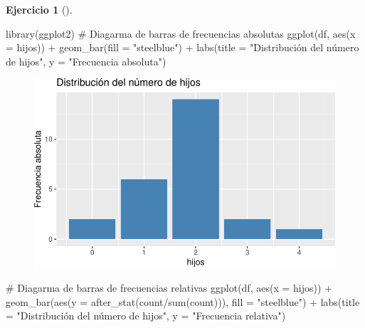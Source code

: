 \documentclass[
  a4paper,
]{scrreport}
\newenvironment{Shaded}{\begin{snugshade}}{\end{snugshade}}
\newcommand{\AttributeTok}[1]{\textcolor[rgb]{0.40,0.45,0.13}{#1}}
\newcommand{\CommentTok}[1]{\textcolor[rgb]{0.37,0.37,0.37}{#1}}
\newcommand{\FunctionTok}[1]{\textcolor[rgb]{0.28,0.35,0.67}{#1}}
\newcommand{\NormalTok}[1]{\textcolor[rgb]{0.00,0.23,0.31}{#1}}
\newcommand{\SpecialCharTok}[1]{\textcolor[rgb]{0.37,0.37,0.37}{#1}}
\newcommand{\StringTok}[1]{\textcolor[rgb]{0.13,0.47,0.30}{#1}}
\theoremstyle{definition}
\newtheorem{exercise}{Ejercicio}[chapter]
\theoremstyle{remark}
\begin{document}
\begin{exercise}[]
\begin{enumerate}
\begin{tcolorbox}
\begin{Shaded}
\begin{Highlighting}[]
\FunctionTok{library}\NormalTok{(ggplot2)}
\CommentTok{\# Diagarma de barras de frecuencias absolutas}
\FunctionTok{ggplot}\NormalTok{(df, }\FunctionTok{aes}\NormalTok{(}\AttributeTok{x =}\NormalTok{ hijos)) }\SpecialCharTok{+}
    \FunctionTok{geom\_bar}\NormalTok{(}\AttributeTok{fill =} \StringTok{"steelblue"}\NormalTok{) }\SpecialCharTok{+} 
    \FunctionTok{labs}\NormalTok{(}\AttributeTok{title =} \StringTok{"Distribución del número de hijos"}\NormalTok{, }\AttributeTok{y =} \StringTok{"Frecuencia absoluta"}\NormalTok{)}
\end{Highlighting}
\end{Shaded}

  \begin{figure}[H]

  {\centering \includegraphics{03-frecuencias-graficos_files/figure-pdf/unnamed-chunk-7-1.pdf}

  }

  \end{figure}

\begin{Shaded}
\begin{Highlighting}[]
\CommentTok{\# Diagarma de barras de frecuencias relativas}
\FunctionTok{ggplot}\NormalTok{(df, }\FunctionTok{aes}\NormalTok{(}\AttributeTok{x =}\NormalTok{ hijos)) }\SpecialCharTok{+}
    \FunctionTok{geom\_bar}\NormalTok{(}\FunctionTok{aes}\NormalTok{(}\AttributeTok{y =} \FunctionTok{after\_stat}\NormalTok{(count}\SpecialCharTok{/}\FunctionTok{sum}\NormalTok{(count))), }\AttributeTok{fill =} \StringTok{"steelblue"}\NormalTok{) }\SpecialCharTok{+}
    \FunctionTok{labs}\NormalTok{(}\AttributeTok{title =} \StringTok{"Distribución del número de hijos"}\NormalTok{, }\AttributeTok{y =} \StringTok{"Frecuencia relativa"}\NormalTok{)}
\end{Highlighting}
\end{Shaded}


\end{tcolorbox}
\end{enumerate}
\end{exercise}
\end{document}
